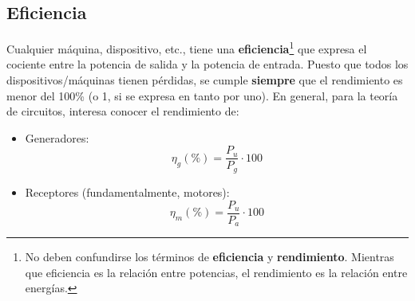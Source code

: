 	\subsection{Eficiencia}
	Cualquier máquina, dispositivo, etc., tiene una \textbf{eficiencia}\footnote{No deben confundirse los términos de \textbf{eficiencia} y \textbf{rendimiento}. Mientras que eficiencia es la relación entre potencias, el rendimiento es la relación entre energías.} %
	que expresa el cociente entre la potencia de salida y la potencia de entrada. Puesto que todos los dispositivos/máquinas tienen pérdidas, se cumple \textbf{siempre} que el rendimiento es menor del 100\% (o 1, si se expresa en tanto por uno). En general, para la teoría de circuitos, interesa conocer el rendimiento de:
	\begin{itemize}
		\item Generadores:
		\begin{equation}
			\boxed{\eta_g (\%) = \frac{P_{u}}{P_{g}}\cdot 100}
		\end{equation}
		\item Receptores (fundamentalmente, motores):
		\begin{equation}
			\boxed{\eta_m (\%) = \frac{P_{u}}{P_{a}}\cdot 100}
		\end{equation}
	\end{itemize}
	
